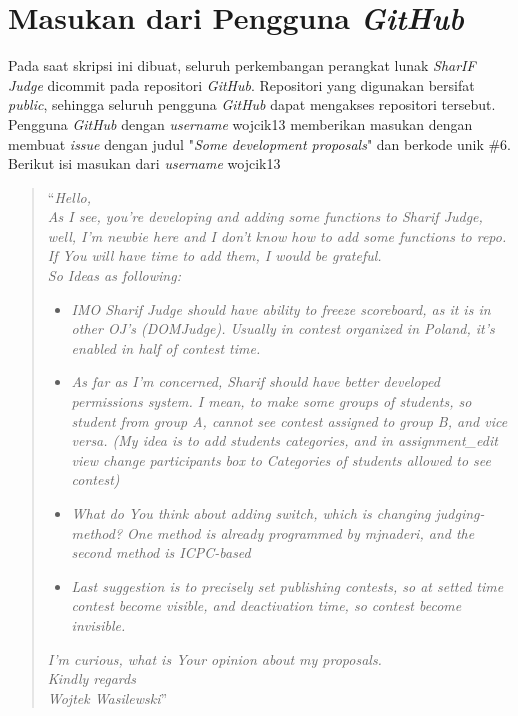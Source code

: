 \section{Masukan dari Pengguna \textit{GitHub}}
\label{sec:masukangithub}
Pada saat skripsi ini dibuat, seluruh perkembangan perangkat lunak \textit{SharIF Judge} dicommit pada repositori \textit{GitHub}. Repositori yang digunakan bersifat \textit{public}, sehingga seluruh pengguna \textit{GitHub} dapat mengakses repositori tersebut. Pengguna \textit{GitHub} dengan \textit{username} wojcik13 memberikan masukan dengan membuat \textit{issue} dengan judul "\textit{Some development proposals}" dan berkode unik \#6. Berikut isi masukan dari \textit{username} wojcik13
\begin{quote}
	``\textit{Hello,} \\
	\textit{As I see, you're developing and adding some functions to Sharif Judge, well, I'm newbie here and I don't know how to add some functions to repo. If You will have time to add them, I would be grateful.}\\
	\textit{So Ideas as following:} 
	\begin{itemize}
		\item \textit{IMO Sharif Judge should have ability to freeze scoreboard, as it is in other OJ's (DOMJudge). Usually in contest organized in Poland, it's enabled in half of contest time. }
		\item \textit{As far as I'm concerned, Sharif should have better developed permissions system. I mean, to make some groups of students, so student from group A, cannot see contest assigned to group B, and vice versa. (My idea is to add students categories, and in assignment\_edit view change participants box to Categories of students allowed to see contest) }
		\item \textit{What do You think about adding switch, which is changing judging-method? One method is already programmed by mjnaderi, and the second method is ICPC-based }
		\item \textit{Last suggestion is to precisely set publishing contests, so at setted time contest become visible, and deactivation time, so contest become invisible.}
	\end{itemize}
	\textit{I'm curious, what is Your opinion about my proposals.}\\
	\textit{Kindly regards}\\
	\textit{Wojtek Wasilewski}''
\end{quote}

